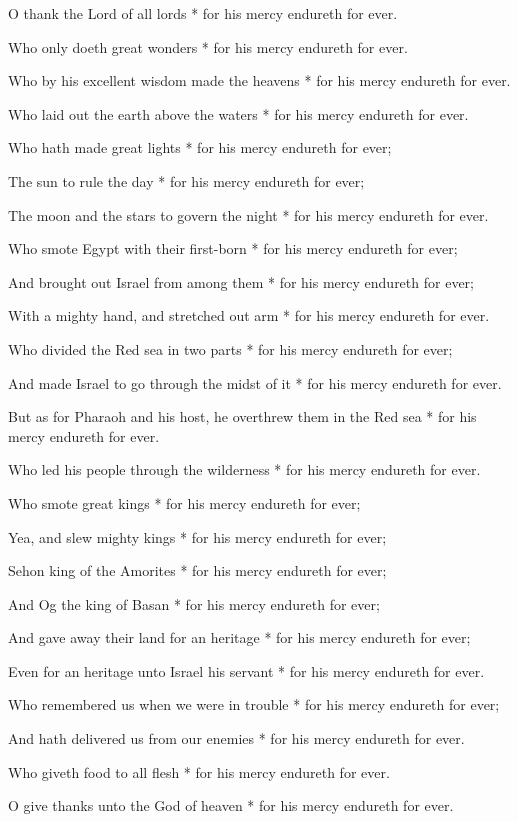 O thank the Lord of all lords * for his mercy endureth for ever.

Who only doeth great wonders * for his mercy endureth for ever.

Who by his excellent wisdom made the heavens * for his mercy endureth for ever.

Who laid out the earth above the waters * for his mercy endureth for ever.

Who hath made great lights * for his mercy endureth for ever;

The sun to rule the day * for his mercy endureth for ever;

The moon and the stars to govern the night * for his mercy endureth for ever.

Who smote Egypt with their first-born * for his mercy endureth for ever;

And brought out Israel from among them * for his mercy endureth for ever;

With a mighty hand, and stretched out arm * for his mercy endureth for ever.

Who divided the Red sea in two parts * for his mercy endureth for ever;

And made Israel to go through the midst of it * for his mercy endureth for ever.

But as for Pharaoh and his host, he overthrew them in the Red sea * for his mercy endureth for ever.

Who led his people through the wilderness * for his mercy endureth for ever.

Who smote great kings * for his mercy endureth for ever;

Yea, and slew mighty kings * for his mercy endureth for ever;

Sehon king of the Amorites * for his mercy endureth for ever;

And Og the king of Basan * for his mercy endureth for ever;

And gave away their land for an heritage * for his mercy endureth for ever;

Even for an heritage unto Israel his servant * for his mercy endureth for ever.

Who remembered us when we were in trouble * for his mercy endureth for ever;

And hath delivered us from our enemies * for his mercy endureth for ever.

Who giveth food to all flesh * for his mercy endureth for ever.

O give thanks unto the God of heaven * for his mercy endureth for ever.

